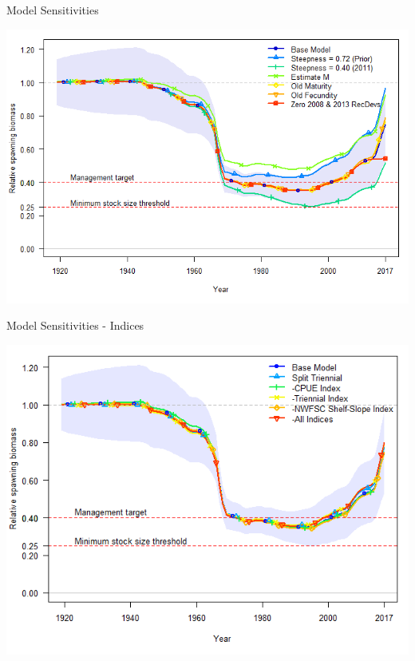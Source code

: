\documentclass[pdf]{beamer}\usepackage[]{graphicx}\usepackage[]{color}
\begin{document}
\begin{frame}{Model Sensitivities}
  \begin{center}
    \includegraphics[scale = 0.40]{figures/Bratio_sensitivites_1.png}
  \end{center}
\end{frame}

\begin{frame}{Model Sensitivities - Indices}
  \begin{center}
    \includegraphics[scale = 0.40]{figures/Bratio_indices.png}
  \end{center}
\end{frame}
\end{document}
